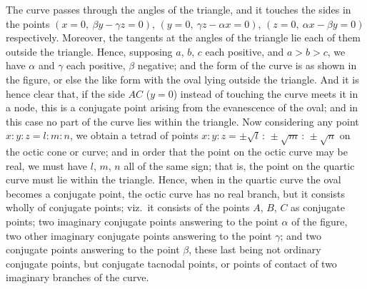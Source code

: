 \documentclass[11pt]{article}
\begin{document}
The curve passes through the angles of the triangle, and it touches the sides in the points $(x = 0,\ \beta y - \gamma z = 0)$, $(y = 0,\ \gamma z - \alpha x = 0)$, $(z = 0,\ \alpha x - \beta y = 0)$ respectively. Moreover, the tangents at the angles of the triangle lie each of them outside the triangle. Hence, supposing $a$, $b$, $c$ each positive, and $a > b > c$, we have $\alpha$ and $\gamma$ each positive, $\beta$ negative; and the form of the curve is as shown in the figure, or else the like form with the oval lying outside the triangle. And it is hence clear that, if the side $AC$ ($y = 0$) instead of touching the curve meets it in a node, this is a conjugate point arising from the evanescence of the oval; and in this case no part of the curve lies within the triangle. Now considering any point $x : y : z = l : m : n$, we obtain a tetrad of points $x : y : z = \pm\sqrt{l}\,\colon\,\pm\sqrt{m}\,\colon\,\pm\sqrt{n}$ on the octic cone or curve; and in order that the point on the octic curve may be real, we must have $l$, $m$, $n$ all of the same sign; that is, the point on the quartic curve must lie within the triangle. Hence, when in the quartic curve the oval becomes a conjugate point, the octic curve has no real branch, but it consists wholly of conjugate points; viz.\ it consists of the points $A$, $B$, $C$ as conjugate points; two imaginary conjugate points answering to the point $\alpha$ of the figure, two other imaginary conjugate points answering to the point $\gamma$; and two conjugate points answering to the point $\beta$, these last being not ordinary conjugate points, but conjugate tacnodal points, or points of contact of two imaginary branches of the curve.

\medskip

\begin{center}
\end{center}
\end{document}
